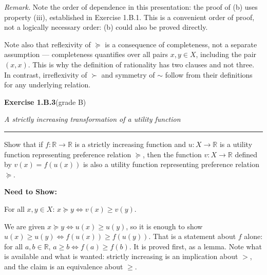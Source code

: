 \documentclass[12pt]{article}
\newcommand{\exercise}[3]{%
  \par\penalty-250\bigskip\Needspace{8\baselineskip}
  \noindent\textbf{\large Exercise #1}\quad\textnormal{(grade #2)}%
  \par\nobreak\smallskip
  \noindent\textit{#3}%
  \par\nobreak\smallskip
  \noindent\rule{\linewidth}{0.4pt}%
  \par\nobreak\smallskip}
\newenvironment{statement}{\par\medskip}{\par\medskip}
\newenvironment{nts}
  {\par\medskip\Needspace{3\baselineskip}%
   \noindent\textbf{Need to Show:}\par\nobreak\smallskip}
  {\par\medskip}
\newenvironment{remark}
  {\par\medskip\noindent\textit{Remark.}\enspace}
  {\par\medskip}
\begin{document}
\begin{remark}
  Note the order of dependence in this presentation: the proof of (b) uses
  property (iii), established in Exercise 1.B.1. This is a convenient order of
  proof, not a logically necessary order: (b) could also be proved directly.

  Note also that reflexivity of $\succeq$ is a consequence of completeness, not a
  separate assumption --- completeness quantifies over all pairs $x,y\in X$,
  including the pair $(x,x)$. This is why the definition of rationality has two
  clauses and not three. In contrast, irreflexivity of $\succ$ and symmetry
  of $\sim$ follow from their definitions for any underlying relation.
\end{remark}

\exercise{1.B.3}{B}{A strictly increasing transformation of a utility function}

\begin{statement}
  Show that if $f:\mathbb R\to\mathbb R$ is a strictly increasing function and
  $u:X\to\mathbb R$ is a utility function representing preference relation
  $\succeq$, then the function $v:X\to\mathbb R$ defined by $v(x)=f(u(x))$ is
  also a utility function representing preference relation $\succeq$.
\end{statement}

\begin{nts}
  For all $x,y\in X$: $x\succeq y \iff v(x)\geq v(y)$.
  \medskip

  \noindent
  We are given $x\succeq y\iff u(x)\geq u(y)$, so it is enough to show
  $u(x)\geq u(y)\iff f(u(x))\geq f(u(y))$. That is a statement about $f$ alone:
  for all $a,b\in\mathbb R$, $a\geq b\iff f(a)\geq f(b)$. It is proved first, as
  a lemma. Note what is available and what is wanted: strictly increasing is an
  implication about $>$, and the claim is an equivalence about $\geq$.
\end{nts}
\end{document}
